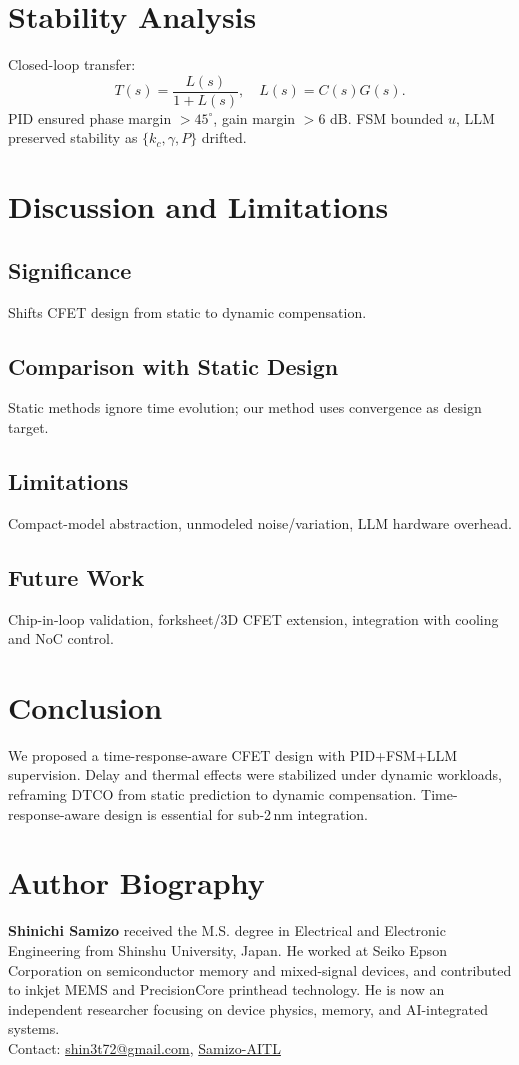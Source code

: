 \documentclass[conference]{IEEEtran}
\begin{document}
\section{Stability Analysis}
Closed-loop transfer:
\[
T(s) = \frac{L(s)}{1+L(s)}, \quad L(s)=C(s)G(s).
\]
PID ensured phase margin $>45^\circ$, gain margin $>6$ dB. FSM bounded $u$, LLM preserved stability as $\{k_c,\gamma,P\}$ drifted.

\section{Discussion and Limitations}
\subsection{Significance}
Shifts CFET design from static to dynamic compensation.  
\subsection{Comparison with Static Design}
Static methods ignore time evolution; our method uses convergence as design target.  
\subsection{Limitations}
Compact-model abstraction, unmodeled noise/variation, LLM hardware overhead.  
\subsection{Future Work}
Chip-in-loop validation, forksheet/3D CFET extension, integration with cooling and NoC control.  

\section{Conclusion}
We proposed a time-response-aware CFET design with PID+FSM+LLM supervision. Delay and thermal effects were stabilized under dynamic workloads, reframing DTCO from static prediction to dynamic compensation. Time-response-aware design is essential for sub-2\,nm integration.  




\section*{Author Biography}
\noindent\textbf{Shinichi Samizo} received the M.S. degree in Electrical and Electronic Engineering from Shinshu University, Japan. He worked at Seiko Epson Corporation on semiconductor memory and mixed-signal devices, and contributed to inkjet MEMS and PrecisionCore printhead technology. He is now an independent researcher focusing on device physics, memory, and AI-integrated systems.\\
Contact: \href{mailto:shin3t72@gmail.com}{shin3t72@gmail.com}, \href{https://github.com/Samizo-AITL}{Samizo-AITL}
\end{document}
